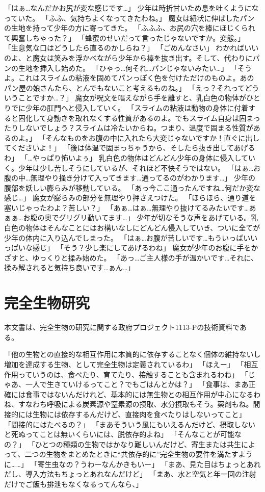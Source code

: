 「はぁ…なんだかお尻が変な感じです…」
少年は時折甘いため息を吐くようになっていた。
「ふふ、気持ちよくなってきたわね。」
魔女は紐状に伸ばしたパンの生地を持って少年の方に寄ってきた。
「ふふふ、お尻の穴を棒にほじくられて興奮しちゃった？」
「蜂蜜のせいだって言ったじゃないですか。変態。」
「生意気な口はどうしたら直るのかしらね？」
「ごめんなさい」
わかればいいのよ、と魔女は笑みを浮かべながら少年から棒を抜き出す。そして、代わりにパンの生地を挿入し始めた。
「ひゃっ…何それ…パンじゃないみたい…」
「そうよ。これはスライムの粘液を固めてパンっぽく色を付けただけのものよ。あのパン屋の娘さんたら、とんでもないこと考えるものね。」
「えっ？それってどういうことですか…？」
魔女が呪文を唱えながら手を離すと、乳白色の物体がひとりでに少年の肛門へと侵入していく。
「スライムの粘液は動物の身体に付着すると固化して身動きを取れなくする性質があるのよ。でもスライム自身は固まったりしないでしょう？スライムは冷たいからね。つまり、温度で固まる性質があるのよ。」
「そんなものをお腹の中に入れたら大変じゃないですか！直ぐに出してくださいよ！」
「後は体温で固まっちゃうから、そしたら抜き出してあげるわ」
「…やっぱり怖いよぅ」
乳白色の物体はどんどん少年の身体に侵入していく。少年は少し苦しそうにしているが、それほど不快そうではない。
「はぁ…お腹の中…無理やり掻き分けて入ってきます…通ってるのがわかります…」
少年の腹部を妖しい膨らみが移動している。
「あっ今ここ通ったんですね…何だか変な感じ…」
魔女が膨らみの部分を無理やり押さえつけた。
「ほらほら、通り道を塞いじゃったわよ？苦しい？」
「あぁ…はぁ…無理やり抜けてるみたいです…あぁぁ…お腹の奥でグリグリ動いてます…」
少年が切なそうな声をあげている。乳白色の物体はそんなことにはお構いなしにどんどん侵入していき、ついに全てが少年の体内に入り込んでしまった。
「はぁ…お腹が苦しいです…もういっぱいいっぱいな感じ」
「そう？少し楽にしてあげるわね」
魔女が少年のお腹に手をかざすと、ゆっくりと揉み始めた。
「あっ…ご主人様の手が温かいです…それに、揉み解されると気持ち良いです…ぁん…」


\section{完全生物研究}
本文書は、完全生物の研究に関する政府プロジェクト1113-Pの技術資料である。

「他の生物との直接的な相互作用に本質的に依存することなく個体の維持ないし増加を達成する生物、として完全生物は定義されているわ」
「ほえー」
「相互作用っていうのは、食べたり、育てたり、接触することも含まれるわね」
「じゃあ、一人で生きていけるってこと？でもごはんとかは？」
「食事は、まあ正確には食事ではないんだけれど、基本的には無生物との相互作用が中心になるわね、すなわち呼吸による炭素源や窒素源の摂取、水分摂取もそう。薬剤もね。間接的には生物には依存するんだけど、直接肉を食べたりはしないってこと」
「間接的にはたべるの？」
「まあそういう風にもいえるんだけど、摂取しないと死ぬってことは無いくらいには、脱依存的よね」
「そんなことが可能なの？」
「ひとつの種類の生物ではかなり難しいんだけど、寄生または共生によって、二つの生物をまとめたときに“共依存的に”完全生物の要件を満たすように……」
「寄生虫なの？うわーなんかきもいー」
「まあ、見た目はちょっとあれだし、導入方法もちょっとあれなんだけど」
「まあ、水と空気と年一回の注射だけでご飯も排泄もなくなるってんなら、」



